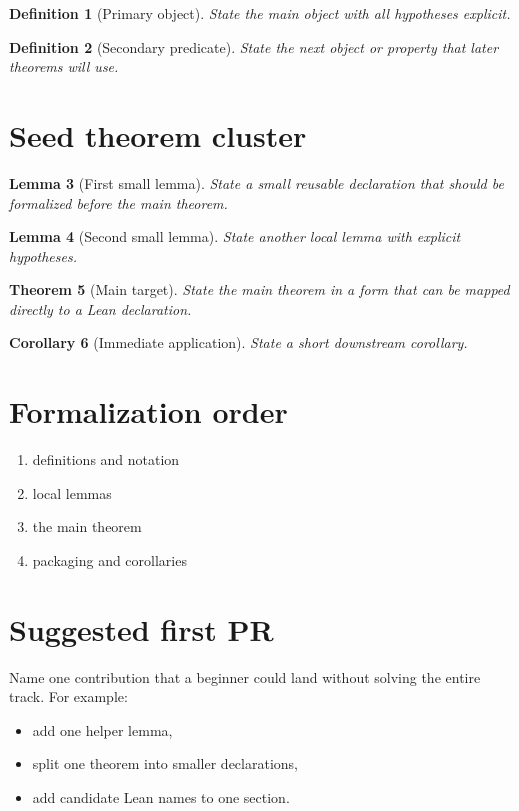 \documentclass[11pt]{article}
\newtheorem{definition}{Definition}[section]
\newtheorem{lemma}[definition]{Lemma}
\newtheorem{theorem}[definition]{Theorem}
\newtheorem{corollary}[definition]{Corollary}
\begin{document}
\begin{definition}[Primary object]\label{def:primary-object}
State the main object with all hypotheses explicit.
\end{definition}

\begin{definition}[Secondary predicate]\label{def:secondary-predicate}
State the next object or property that later theorems will use.
\end{definition}

\section{Seed theorem cluster}

\begin{lemma}[First small lemma]\label{lem:first-small-lemma}
State a small reusable declaration that should be formalized before the main
theorem.
\end{lemma}

\begin{lemma}[Second small lemma]\label{lem:second-small-lemma}
State another local lemma with explicit hypotheses.
\end{lemma}

\begin{theorem}[Main target]\label{thm:main-target}
State the main theorem in a form that can be mapped directly to a Lean
declaration.
\end{theorem}

\begin{corollary}[Immediate application]\label{cor:immediate-application}
State a short downstream corollary.
\end{corollary}

\section{Formalization order}

\begin{enumerate}
\item definitions and notation
\item local lemmas
\item the main theorem
\item packaging and corollaries
\end{enumerate}

\section{Suggested first PR}

Name one contribution that a beginner could land without solving the entire
track. For example:

\begin{itemize}
\item add one helper lemma,
\item split one theorem into smaller declarations,
\item add candidate Lean names to one section.
\end{itemize}
\end{document}
